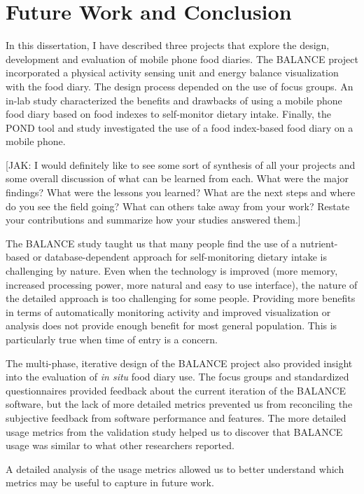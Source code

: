 \chapter{Future Work and Conclusion}
In this dissertation, I have described three projects that explore the design,  development and evaluation of mobile phone food diaries. The BALANCE project incorporated a physical activity sensing unit and energy balance visualization with the food diary. The design process depended on the use of focus groups. An in-lab study characterized the benefits and drawbacks of using a mobile phone food diary based on food indexes to self-monitor dietary intake. Finally, the POND tool and study investigated the use of a food index-based food diary on a mobile phone. 

[JAK: I would definitely like to see some sort of synthesis of all your projects and some overall discussion of what can be learned from each. What were the major findings? What were the lessons you learned? What are the next steps and where do you see the field going? What can others take away from your work? Restate your contributions and summarize how your studies answered them.] 

The BALANCE study taught us that many people find the use of a nutrient-based or database-dependent approach for self-monitoring dietary intake is challenging by nature. Even when the technology is improved (more memory, increased processing power, more natural and easy to use interface), the nature of the detailed approach is too challenging for some people. Providing more benefits in terms of automatically monitoring activity and improved visualization or analysis does not provide enough benefit for most general population. This is particularly true when time of entry is a concern. 

The multi-phase, iterative design of the BALANCE project also provided insight into the evaluation of \textit{in situ} food diary use. The focus groups and standardized questionnaires provided feedback about the current iteration of the BALANCE software, but the lack of more detailed metrics prevented us from reconciling the subjective feedback from software performance and features. The more detailed usage metrics from the validation study helped us to discover that BALANCE usage was similar to what other researchers reported. 

A detailed analysis of the usage metrics allowed us to better understand which metrics may be useful to capture in future work. 

